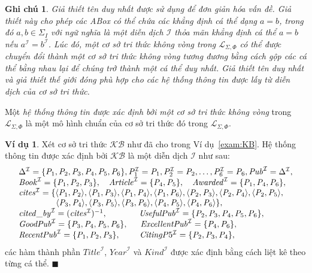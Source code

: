 \documentclass[12pt,a4paper,twoside]{report}
\newcommand{\mL}		{\mathcal{L}}
\newcommand{\mI}		{\mathcal{I}}
\newcommand{\SigmaI}	{\Sigma_I}
\newcommand{\KB}		{\mathcal{KB}}
\newcommand{\mLSP}		{\mL_{\Sigma,\Phi}}
\newcommand{\myend}		{\mbox{}\hfill\mbox{{\scriptsize$\!\blacksquare$}}}
\newcommand{\tuple}[1]	{\left\langle#1\right\rangle\!}
\newcommand{\Publication}	{\mathit{Pub}}
\newcommand{\Pub}			{\mathit{P}}
\newcommand{\Book}			{\mathit{Book}}
\newcommand{\Article}		{\mathit{Article}}
\newcommand{\Kind}			{\mathit{Kind}}
\newcommand{\Awarded}		{\mathit{Awarded}}
\newcommand{\PubName}		{\mathit{Title}}
\newcommand{\PubYear}		{\mathit{Year}}
\newcommand{\Cites}			{\mathit{cites}}
\newcommand{\Citedby}		{\mathit{cited\!\,\_by}}
\newcommand{\UsefulPub}		{\mathit{UsefulPub}}
\newcommand{\GoodPub}		{\mathit{GoodPub}}
\newcommand{\ExcellentPub}	{\mathit{ExcellentPub}}
\newcommand{\RecentPub}		{\mathit{RecentPub}}
\newcommand{\CitingP}		{\mathit{CitingP}}
\newtheorem{Remark}{Ghi chú}[chapter]
\theoremstyle{definition}
\newtheorem{Example}{Ví dụ}[chapter]
\begin{document}
\begin{Remark}
Giả thiết tên duy nhất được sử dụng để đơn giản hóa vấn đề. Giả thiết này cho phép các ABox có thể chứa các khẳng định cá thể dạng $a=b$, trong đó $a, b \in \SigmaI$ với ngữ nghĩa là một diễn dịch $\mI$ thỏa mãn khẳng định cá thể $a=b$ nếu $a^\mI = b^\mI$. 
Lúc đó, một cơ sở tri thức không vòng trong $\mLSP$ có thể được chuyển đổi thành một cơ sở tri thức không vòng tương đương bằng cách gộp các cá thể bằng nhau lại để chúng trở thành một cá thể duy nhất. Giả thiết tên duy nhất và giả thiết thế giới đóng phù hợp cho các hệ thống thông tin được lấy từ diễn dịch của cơ sở tri thức.
\end{Remark}

Một {\em hệ thống thông tin được xác định bởi một cơ sở tri thức không vòng} trong $\mLSP$ là một mô hình chuẩn của cơ sở tri thức đó trong $\mLSP$.

\begin{Example} \label{exam:InfoSystem}
Xét cơ sở tri thức $\KB$ như đã cho trong Ví dụ~\ref{exam:KB}. Hệ thống thông tin được xác định bởi $\KB$ là một diễn dịch $\mI$ như sau:
\[
\begin{array}{l}
\Delta^\mI = \{\Pub_1, \Pub_2, \Pub_3, \Pub_4, \Pub_5, \Pub_6\}, \Pub_1^\mI = \Pub_1, \Pub_2^\mI = \Pub_2, \ldots, \Pub_6^\mI = \Pub_6, \Publication^\mI = \Delta^\mI,\\
\Book^\mI = \{\Pub_1, \Pub_2, \Pub_3 \}, \quad \Article^\mI = \{\Pub_4, \Pub_5\}, \quad \Awarded^\mI = \{\Pub_1, \Pub_4, \Pub_6\}, \\
\Cites^\mI = \{\tuple{\Pub_1, \Pub_2}, \tuple{\Pub_1, \Pub_3}, \tuple{\Pub_1, \Pub_4}, \tuple{\Pub_1, \Pub_6}, \tuple{\Pub_2, \Pub_3}, \tuple{\Pub_2, \Pub_4}, \tuple{\Pub_2, \Pub_5},\\ \qquad\qquad\;\, \tuple{\Pub_3, \Pub_4}, \tuple{\Pub_3, \Pub_5}, \tuple{\Pub_3, \Pub_6}, \tuple{\Pub_4, \Pub_5}, \tuple{\Pub_4, \Pub_6}\,\},\\
\Citedby^\mI = (\Cites^\mI)^{-1}, \qquad\qquad\! \UsefulPub^\mI = \{\Pub_2, \Pub_3, \Pub_4, \Pub_5, \Pub_6\},\\
\GoodPub^\mI = \{\Pub_3, \Pub_4, \Pub_5, \Pub_6\},\quad\ \, \ExcellentPub^\mI = \{\Pub_4, \Pub_6\},\\
\RecentPub^\mI = \{\Pub_1, \Pub_2, \Pub_3\},\qquad\  \CitingP5^\mI = \{\Pub_2, \Pub_3, \Pub_4\},
\end{array}
\vspace{-1ex}
\]
các hàm thành phần $\PubName^\mI$, $\PubYear^\mI$ và $\Kind^\mI$ được xác định bằng cách liệt kê theo từng cá thể.
\myend
\end{Example}
\end{document}
